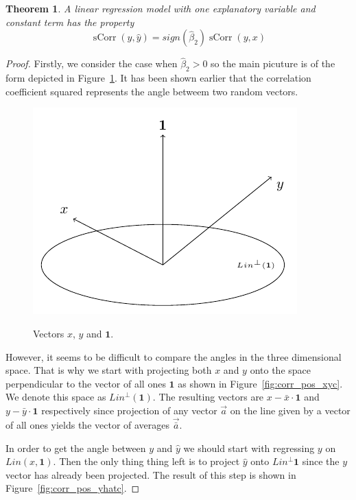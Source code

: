 \documentclass[nobib]{tufte-handout}
\DeclareMathOperator{\sCorr}{sCorr}
\newtheorem{theorem}{Theorem}
\begin{document}
\begin{theorem}
A linear regression model with one explanatory variable and constant term has the property
\[
\sCorr(y, \hat y) = sign(\hat \beta_2) \sCorr(y, x)
\]
\end{theorem}

\begin{proof}
Firstly, we consider the case when $\hat \beta_2 > 0$ so the main picuture is of the form depicted in Figure~\ref{fig:corr_pos_base}.
It has been shown earlier that the correlation coefficient squared represents the angle betweem two random vectors.

\begin{figure}[ht!]
\begin{center}
\includegraphics{images/corr_eq_positive.pdf}
\label{fig:corr_pos_base}
\caption{Vectors $x$, $y$ and $\mathbf{1}$.}
\end{center}
\end{figure}

However, it seems to be difficult to compare the angles in the three dimensional space.
That is why we start with projecting both $x$ and $y$ onto the space perpendicular to the vector of all ones $\mathbf{1}$ as shown in Figure~\ref{fig:corr_pos_xyc}.
We denote this space as $Lin^{\perp}(\mathbf{1})$. The resulting vectors are $x - \bar x \cdot \mathbf{1}$  and $y - \bar y \cdot \mathbf{1}$ respectively
since projection of any vector $\vec{a}$ on the line given by a vector of all ones yields the vector of averages $\vec{\bar a}$.

In order to get the angle between $y$ and $\hat y$ we should start with regressing $y$ on $Lin(x, \mathbf{1})$.
Then the only thing thing left is to project $\hat y$ onto $Lin^{\perp}\mathbf{1}$ since the $y$ vector has already been projected.
The result of this step is shown in Figure~\ref{fig:corr_pos_yhatc}.


\end{proof}
\end{document}
